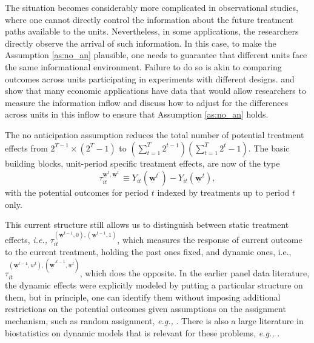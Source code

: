 \documentclass[letterpaper,12pt,leqno]{article}
\newcommand{\ubww}{\underline{\mathbf{w}}}
\begin{document}
The situation becomes considerably more complicated in observational studies, where one cannot directly control the information about the future treatment paths available to the units. Nevertheless, in some applications, the researchers directly observe the arrival of such information. In this case, to make the Assumption \ref{as:no_an} plausible, one needs to guarantee that different units face the same informational environment. Failure to do so is akin to comparing outcomes across units participating in experiments with different designs. \citep{abbring2003nonparametric} and \citep{abbring2007econometric} show that many economic applications have data that would allow researchers to measure the information inflow and discuss how to adjust for the differences across units in this inflow to ensure that Assumption \ref{as:no_an} holds.

The no anticipation assumption reduces the total number of potential treatment effects from $ 2^{T-1}\times(2^T-1)$ to $(\sum_{t=1}^T 2^{t-1})(\sum_{t=1}^T 2^t-1)$. The basic building blocks, unit-period specific treatment effects, are now of the type
\begin{equation}\label{eq:estimand_general_1}
\tau^{\ubww^t,\ubww^{t^{\prime}}}_{it}\equiv Y_{it}(\ubww^{t^\prime}) -Y_{it}(\ubww^t),
\end{equation}
with the potential outcomes for period $t$ indexed by treatments up to period $t$ only.


This current structure still allows us to distinguish between static treatment effects, {\it i.e.,} $\tau^{(\ubww^{t-1},0),(\ubww^{t-1},1)}_{it}$, which measures the response of current outcome to the current treatment, holding the past ones fixed, and dynamic ones, i.e., $\tau^{(\ubww^{t-1},w^t),({\ubww^{\prime}}^{t-1},w^t)}_{it}$, which does the opposite. In the earlier panel data literature, the dynamic effects were explicitly modeled by putting a particular structure on them, but in principle, one can identify them without imposing additional restrictions on the potential outcomes given assumptions on the assignment mechanism, such as random assignment, {\it e.g., } \citep{bojinov2021panel}. There is also a large literature in biostatistics on dynamic models that is relevant for these problems, {\it e.g., } \citep{robins2000marginal, murphy2003optimal}.
\end{document}

